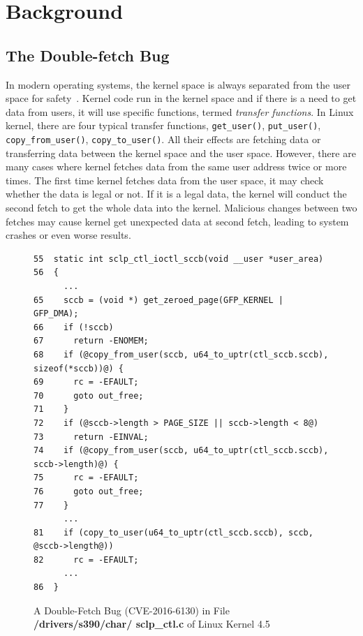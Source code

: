 \documentclass[10pt]{llncs}
\begin{document}
\section{Background}%
\label{back}


\subsection{The Double-fetch Bug}
\label{back1}
In modern operating systems, the kernel space is always separated from the user space for safety~\cite{swift2003improving}. Kernel code run in the kernel space and if there is a need to get data from users, it will use specific functions, termed \emph{transfer functions}. In Linux kernel, there are four typical transfer functions, \verb:get_user():, \verb:put_user():, \verb:copy_from_user():, \verb:copy_to_user():. All their effects are fetching data or transferring data between the kernel space and the user space. However, there are many cases where kernel fetches data from the same user address twice or more times. The first time kernel fetches data from the user space, it may check whether the data is legal or not. If it is a legal data, the kernel will conduct the second fetch to get the whole data into the kernel. Malicious changes between two fetches may cause kernel get unexpected data at second fetch, leading to system crashes or even worse results.


\begin{figure}[t]
  \centering
\begin{lstlisting}[style=code]
55  static int sclp_ctl_ioctl_sccb(void __user *user_area)
56  {
	  ...
65    sccb = (void *) get_zeroed_page(GFP_KERNEL | GFP_DMA);
66    if (!sccb)
67      return -ENOMEM;
68    if (@copy_from_user(sccb, u64_to_uptr(ctl_sccb.sccb), sizeof(*sccb))@) {
69      rc = -EFAULT;
70      goto out_free;
71    }
72    if (@sccb->length > PAGE_SIZE || sccb->length < 8@)
73      return -EINVAL;
74    if (@copy_from_user(sccb, u64_to_uptr(ctl_sccb.sccb), sccb->length)@) {
75      rc = -EFAULT;
76      goto out_free;
77    }
	  ...
81    if (copy_to_user(u64_to_uptr(ctl_sccb.sccb), sccb, @sccb->length@))
82      rc = -EFAULT;
  	  ...
86  }
\end{lstlisting}
  \caption{A Double-Fetch Bug (CVE-2016-6130) in File \textbf{/drivers/s390/char/ sclp\_ctl.c} of Linux Kernel 4.5}
  \label{df-6130}
\end{figure}
\end{document}
